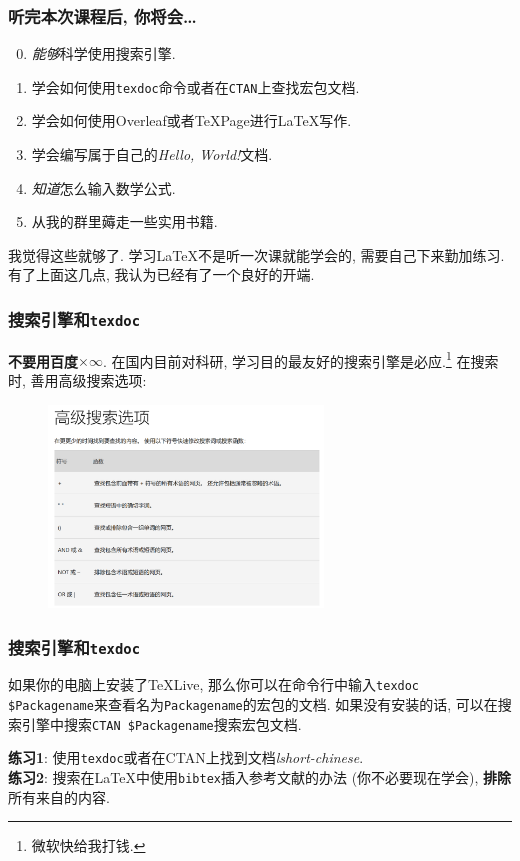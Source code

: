 \documentclass{beamer}
\begin{document}
\begin{frame}
    \frametitle{听完本次课程后, 你将会\dots}
    \begin{enumerate}[(1)]
        \setcounter{enumi}{-1}
        \item \emph{能够}科学使用搜索引擎.
        \item 学会如何使用\Verb|texdoc|命令或者在\Verb|CTAN|上查找宏包文档.
        \item 学会如何使用Overleaf或者\TeX{}Page进行\LaTeX{}写作.
        \item 学会编写属于自己的\emph{Hello, World!}文档.
        \item \emph{知道}怎么输入数学公式.
        \item 从我的群里薅走一些实用书籍.
    \end{enumerate}\pause
    我觉得这些就够了.
    学习\LaTeX{}不是听一次课就能学会的, 需要自己下来勤加练习.
    有了上面这几点, 我认为已经有了一个良好的开端.
\end{frame}

\begin{frame}
    \frametitle{搜索引擎和\Verb|texdoc|}
    \textbf{不要用百度}$\times\infty$.
    在国内目前对科研, 学习目的最友好的搜索引擎是必应.\footnote{微软快给我打钱.}
    在搜索时, 善用高级搜索选项:
    \begin{figure}[h]
        \centering
        \includegraphics[width=0.65\textwidth]{figure/bing-search.png}
    \end{figure}
\end{frame}

\begin{frame}[fragile]
    \frametitle{搜索引擎和\Verb|texdoc|}
    如果你的电脑上安装了\TeX{}Live, 那么你可以在命令行中输入\Verb|texdoc $Packagename|来查看名为\Verb|Packagename|的宏包的文档.
    如果没有安装的话, 可以在搜索引擎中搜索\Verb|CTAN $Packagename|搜索宏包文档.\pause

    \textbf{练习1}: 使用\Verb|texdoc|或者在CTAN上找到文档\emph{lshort-chinese}.\\
    \textbf{练习2}: 搜索在\LaTeX{}中使用\Verb|bibtex|插入参考文献的办法 (你不必要现在学会), \textbf{排除}所有来自的内容.
\end{frame}
\end{document}
